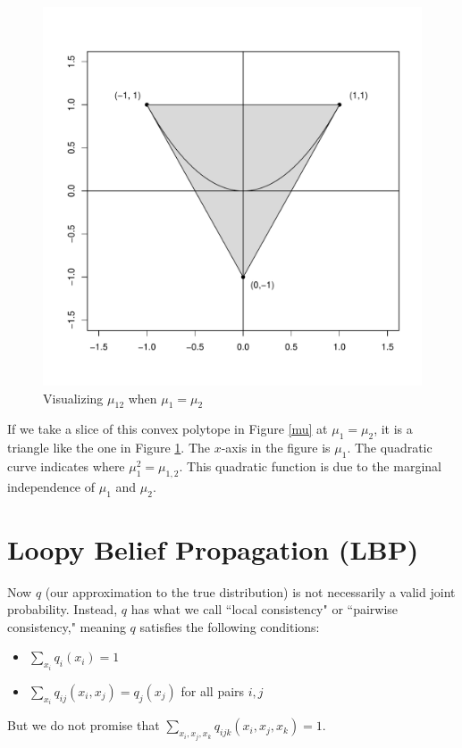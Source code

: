 \documentclass[twoside]{article}
\begin{document}
\begin{figure}[h!]
\begin{center}
\includegraphics[scale=0.5]{triangle.pdf}
\caption{Visualizing $\mu_{12}$ when $\mu_1=\mu_2$}
\label{mu2}
\end{center}
\end{figure}

If we take a slice of this convex polytope in Figure \ref{mu} at $\mu_1=\mu_2$, it is a triangle like the one in Figure \ref{mu2}. The $x$-axis in the figure is $\mu_1$. The quadratic curve indicates where $\mu_1^2=\mu_{1,2}$. This quadratic function is due to the marginal independence of $\mu_1$ and $\mu_2$. 




\section{Loopy Belief Propagation (LBP)}
Now $q$ (our approximation to the true distribution) is not necessarily a valid joint probability. Instead, $q$ has what we call ``local consistency" or ``pairwise consistency," meaning $q$ satisfies the following conditions:
\begin{itemize}
\item $\displaystyle \sum_{x_i} q_i(x_i) = 1$
\item $\displaystyle \sum_{x_i} q_{ij}(x_i, x_j) = q_j(x_j)$ for all pairs $i, j$
\end{itemize}
But we do not promise that $\displaystyle \sum_{x_i, x_j, x_k} q_{ijk}(x_i, x_j, x_k) = 1$.\\
\end{document}
